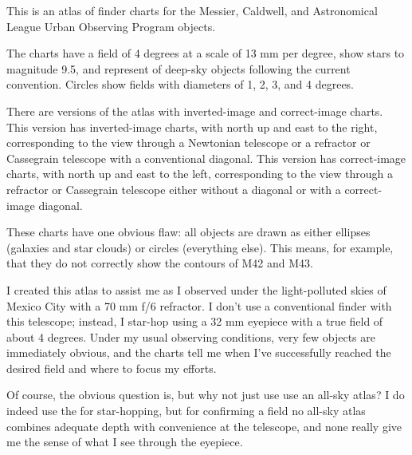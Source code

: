 This is an atlas of finder charts for the Messier, Caldwell, and Astronomical League Urban Observing Program objects. 

The charts have a field of 4 degrees at a scale of 13 mm per degree, show stars to magnitude 9.5, and represent of deep-sky objects following the current convention. Circles show fields with diameters of 1, 2, 3, and 4 degrees.

There are versions of the atlas with inverted-image and correct-image charts. 
\ifinverted
This version has inverted-image charts, with north up and east to the right, corresponding to the view through a Newtonian telescope or a refractor or Cassegrain telescope with a conventional diagonal.
\else
This version has correct-image charts, with north up and east to the left, corresponding to the view through a refractor or Cassegrain telescope either without a diagonal or with a correct-image diagonal.
\fi

These charts have one obvious flaw: all objects are drawn as either ellipses (galaxies and star clouds) or circles (everything else). This means, for example, that they do not correctly show the contours of M42 and M43.

I created this atlas to assist me as I observed under the light-polluted skies of Mexico City with a 70 mm f/6 refractor. I don't use a conventional finder with this telescope; instead, I star-hop using a 32 mm eyepiece with a true field of about 4 degrees. Under my usual observing conditions, very few objects are immediately obvious, and the charts tell me when I've successfully reached the desired field and where to focus my efforts.

Of course, the obvious question is, but why not just use use an all-sky atlas? I do indeed use the {\PSA} for star-hopping, but for confirming a field no all-sky atlas combines adequate depth with convenience at the telescope, and none really give me the sense of what I see through the eyepiece.


